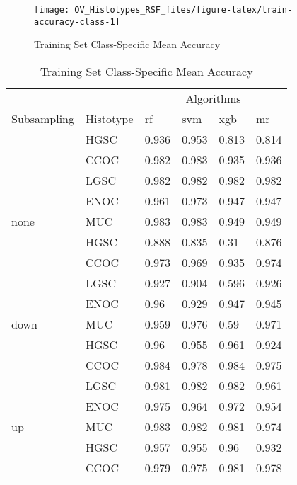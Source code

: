 \documentclass[
]{report}
\begin{document}
\begin{figure}[H]

{\centering \texttt{[image: OV\_Histotypes\_RSF\_files/figure-latex/train-accuracy-class-1]} 

}

\caption{Training Set Class-Specific Mean Accuracy}\label{fig:train-accuracy-class}
\end{figure}

\begin{table}

\caption{\label{tab:train-accuracy-class-table}Training Set Class-Specific Mean Accuracy}
\centering
\begin{tabular}[t]{l|l|l|l|l|l}
\hline
\multicolumn{2}{c|}{ } & \multicolumn{4}{c}{Algorithms} \\
\cline{3-6}
Subsampling & Histotype & rf & svm & xgb & mr\\
\hline
 & HGSC & 0.936 & 0.953 & 0.813 & 0.814\\
\cline{2-6}
 & CCOC & 0.982 & 0.983 & 0.935 & 0.936\\
\cline{2-6}
 & LGSC & 0.982 & 0.982 & 0.982 & 0.982\\
\cline{2-6}
 & ENOC & 0.961 & 0.973 & 0.947 & 0.947\\
\cline{2-6}
\multirow{-5}{*}{\raggedright\arraybackslash none} & MUC & 0.983 & 0.983 & 0.949 & 0.949\\
\cline{1-6}
 & HGSC & 0.888 & 0.835 & 0.31 & 0.876\\
\cline{2-6}
 & CCOC & 0.973 & 0.969 & 0.935 & 0.974\\
\cline{2-6}
 & LGSC & 0.927 & 0.904 & 0.596 & 0.926\\
\cline{2-6}
 & ENOC & 0.96 & 0.929 & 0.947 & 0.945\\
\cline{2-6}
\multirow{-5}{*}{\raggedright\arraybackslash down} & MUC & 0.959 & 0.976 & 0.59 & 0.971\\
\cline{1-6}
 & HGSC & 0.96 & 0.955 & 0.961 & 0.924\\
\cline{2-6}
 & CCOC & 0.984 & 0.978 & 0.984 & 0.975\\
\cline{2-6}
 & LGSC & 0.981 & 0.982 & 0.982 & 0.961\\
\cline{2-6}
 & ENOC & 0.975 & 0.964 & 0.972 & 0.954\\
\cline{2-6}
\multirow{-5}{*}{\raggedright\arraybackslash up} & MUC & 0.983 & 0.982 & 0.981 & 0.974\\
\cline{1-6}
 & HGSC & 0.957 & 0.955 & 0.96 & 0.932\\
\cline{2-6}
 & CCOC & 0.979 & 0.975 & 0.981 & 0.978\\

\end{tabular}
\end{table}
\end{document}
